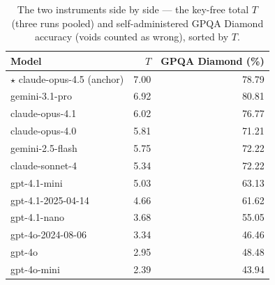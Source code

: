 \documentclass{article}
\begin{document}
\begin{table}[H]
\caption{The two instruments side by side --- the key-free total \(T\) (three runs pooled) and self-administered GPQA Diamond accuracy (voids counted as wrong), sorted by \(T\).}
\label{tab-gpqa-values}
\begin{center}\small
\begin{tabular}{@{}lrr@{}}
\toprule\noalign{}
Model & \(T\) & GPQA Diamond (\%) \\
\midrule\noalign{}
\ensuremath{\star} claude-opus-4.5 (anchor) &\cellcolor[HTML]{2072B2}\textcolor[HTML]{EEF3F8}{7.00}&\cellcolor[HTML]{2351A2}\textcolor[HTML]{EEF3F8}{78.79} \\
gemini-3.1-pro &\cellcolor[HTML]{2076B3}\textcolor[HTML]{EEF3F8}{6.92}&\cellcolor[HTML]{234A9F}\textcolor[HTML]{EEF3F8}{80.81} \\
claude-opus-4.1 &\cellcolor[HTML]{2498C1}\textcolor[HTML]{EEF3F8}{6.02}&\cellcolor[HTML]{2258A5}\textcolor[HTML]{EEF3F8}{76.77} \\
claude-opus-4.0 &\cellcolor[HTML]{2A9EC1}\textcolor[HTML]{EEF3F8}{5.81}&\cellcolor[HTML]{206DAF}\textcolor[HTML]{EEF3F8}{71.21} \\
gemini-2.5-flash &\cellcolor[HTML]{2BA0C2}\textcolor[HTML]{EEF3F8}{5.75}&\cellcolor[HTML]{2169AD}\textcolor[HTML]{EEF3F8}{72.22} \\
claude-sonnet-4 &\cellcolor[HTML]{37ACC3}\textcolor[HTML]{EEF3F8}{5.34}&\cellcolor[HTML]{2169AD}\textcolor[HTML]{EEF3F8}{72.22} \\
gpt-4.1-mini &\cellcolor[HTML]{40B5C4}\textcolor[HTML]{1A1A1A}{5.03}&\cellcolor[HTML]{1D8EBF}\textcolor[HTML]{EEF3F8}{63.13} \\
gpt-4.1-2025-04-14 &\cellcolor[HTML]{52BCC2}\textcolor[HTML]{1A1A1A}{4.66}&\cellcolor[HTML]{2094C0}\textcolor[HTML]{EEF3F8}{61.62} \\
gpt-4.1-nano &\cellcolor[HTML]{83CFBB}\textcolor[HTML]{1A1A1A}{3.68}&\cellcolor[HTML]{32A7C2}\textcolor[HTML]{EEF3F8}{55.05} \\
gpt-4o-2024-08-06 &\cellcolor[HTML]{97D6B9}\textcolor[HTML]{1A1A1A}{3.34}&\cellcolor[HTML]{53BDC1}\textcolor[HTML]{1A1A1A}{46.46} \\
gpt-4o &\cellcolor[HTML]{ADDFB7}\textcolor[HTML]{1A1A1A}{2.95}&\cellcolor[HTML]{49B9C3}\textcolor[HTML]{1A1A1A}{48.48} \\
gpt-4o-mini &\cellcolor[HTML]{CAEAB4}\textcolor[HTML]{1A1A1A}{2.39}&\cellcolor[HTML]{5FC1C0}\textcolor[HTML]{1A1A1A}{43.94} \\
\bottomrule
\end{tabular}
\end{center}
\end{table}
\end{document}

